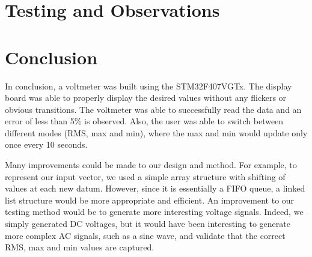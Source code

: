 \documentclass[a4paper,titlepage]{article}
\begin{document}
\section{Testing and Observations}

\section{Conclusion}
In conclusion, a voltmeter was built using the STM32F407VGTx. The display board was able to properly display the desired values without any flickers or obvious transitions. The voltmeter was able to successfully read the data and an error of less than 5\% is observed. Also, the user was able to switch between different modes (RMS, max and min), where the max and min would update only once every 10 seconds.

Many improvements could be made to our design and method. For example, to represent our input vector, we used a simple array structure with shifting of values at each new datum. However, since it is essentially a FIFO queue, a linked list structure would be more appropriate and efficient. An improvement to our testing method would be to generate more interesting voltage signals. Indeed, we simply generated DC voltages, but it would have been interesting to generate more complex AC signals, such as a sine wave, and validate that the correct RMS, max and min values are captured.





\clearpage
\onecolumn
\appendix

{}

\end{document}
